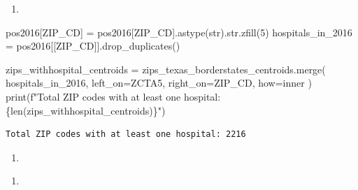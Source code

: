 \documentclass[
  letterpaper,
  DIV=11,
  numbers=noendperiod]{scrartcl}
\newenvironment{Shaded}{\begin{snugshade}}{\end{snugshade}}
\newcommand{\BuiltInTok}[1]{\textcolor[rgb]{0.00,0.23,0.31}{#1}}
\newcommand{\DecValTok}[1]{\textcolor[rgb]{0.68,0.00,0.00}{#1}}
\newcommand{\NormalTok}[1]{\textcolor[rgb]{0.00,0.23,0.31}{#1}}
\newcommand{\OperatorTok}[1]{\textcolor[rgb]{0.37,0.37,0.37}{#1}}
\newcommand{\SpecialCharTok}[1]{\textcolor[rgb]{0.37,0.37,0.37}{#1}}
\newcommand{\SpecialStringTok}[1]{\textcolor[rgb]{0.13,0.47,0.30}{#1}}
\newcommand{\StringTok}[1]{\textcolor[rgb]{0.13,0.47,0.30}{#1}}
\providecommand{\tightlist}{%
  \setlength{\itemsep}{0pt}\setlength{\parskip}{0pt}}\usepackage{longtable,booktabs,array}
\begin{document}
\begin{enumerate}
\def\labelenumi{\arabic{enumi}.}
\setcounter{enumi}{2}
\tightlist
\item
\end{enumerate}

\begin{Shaded}
\begin{Highlighting}[]
\NormalTok{pos2016[}\StringTok{\textquotesingle{}ZIP\_CD\textquotesingle{}}\NormalTok{] }\OperatorTok{=}\NormalTok{ pos2016[}\StringTok{\textquotesingle{}ZIP\_CD\textquotesingle{}}\NormalTok{].astype(}\BuiltInTok{str}\NormalTok{).}\BuiltInTok{str}\NormalTok{.zfill(}\DecValTok{5}\NormalTok{)}
\NormalTok{hospitals\_in\_2016 }\OperatorTok{=}\NormalTok{ pos2016[[}\StringTok{\textquotesingle{}ZIP\_CD\textquotesingle{}}\NormalTok{]].drop\_duplicates()}

\NormalTok{zips\_withhospital\_centroids }\OperatorTok{=}\NormalTok{ zips\_texas\_borderstates\_centroids.merge(}
\NormalTok{    hospitals\_in\_2016, left\_on}\OperatorTok{=}\StringTok{\textquotesingle{}ZCTA5\textquotesingle{}}\NormalTok{, right\_on}\OperatorTok{=}\StringTok{\textquotesingle{}ZIP\_CD\textquotesingle{}}\NormalTok{, how}\OperatorTok{=}\StringTok{\textquotesingle{}inner\textquotesingle{}}
\NormalTok{)}
\BuiltInTok{print}\NormalTok{(}\SpecialStringTok{f"Total ZIP codes with at least one hospital: }\SpecialCharTok{\{}\BuiltInTok{len}\NormalTok{(zips\_withhospital\_centroids)}\SpecialCharTok{\}}\SpecialStringTok{"}\NormalTok{)}
\end{Highlighting}
\end{Shaded}

\begin{verbatim}
Total ZIP codes with at least one hospital: 2216
\end{verbatim}

\begin{enumerate}
\def\labelenumi{\arabic{enumi}.}
\setcounter{enumi}{3}
\tightlist
\item
\end{enumerate}

\begin{enumerate}
\def\labelenumi{\alph{enumi}.}
\tightlist
\item
\end{enumerate}
\end{document}
